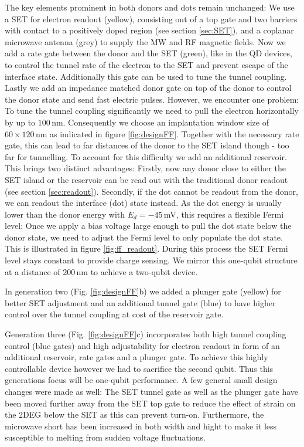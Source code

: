 The key elements prominent in both donors and dots remain unchanged: We use a SET for electron readout (yellow), consisting out of a top gate and two barriers with contact to a positively doped region (see section \ref{sec:SET}), and a coplanar microwave antenna (grey) to supply the MW and RF magnetic fields. 
Now we add a rate gate between the donor and the SET (green), like in the QD devices, to control the tunnel rate of the electron to the SET and prevent escape of the interface state.  Additionally this gate can be used to tune the tunnel coupling. Lastly we add an impedance matched donor gate on top of the donor to control the donor state and send fast electric pulses. 
However, we encounter one problem: To tune the tunnel coupling significantly we need to pull the electron horizontally by up to $100\,$nm. Consequently we choose an implantation window size of $60\times120\,$nm as indicated in figure \ref{fig:designFF}. Together with the necessary rate gate, this can lead to far distances of the donor to the SET island though - too far for tunnelling. To account for this difficulty we add an additional reservoir. This brings two distinct advantages: Firstly, now any donor close to either the SET island or the reservoir can be read out with the traditional donor readout (see section \ref{sec:readout}). Secondly, if the dot cannot be readout from the donor, we can readout the interface (dot) state instead. As the dot energy is usually lower than the donor energy with $E_{d}=-45\,$mV, this requires a flexible Fermi level: Once we apply a bias voltage large enough to pull the dot state below the donor state, we need to adjust the Fermi level to only populate the dot state. This is illustrated in figure \ref{fig:ff_readout}. During this process the SET Fermi level stays constant to provide charge sensing. We mirror this one-qubit structure at a distance of $200\,$nm to achieve a two-qubit device.

In generation two (Fig. \ref{fig:designFF}b) we added a plunger gate (yellow) for better SET adjustment and an additional tunnel gate (blue) to have higher control over the tunnel coupling at cost of the reservoir gate. 

Generation three (Fig. \ref{fig:designFF}c) incorporates both high tunnel coupling control (blue gates) and high adjustability for electron readout in form of an additional reservoir, rate gates and a plunger gate. To achieve this highly controllable device however we had to sacrifice the second qubit. Thus this generations focus will be one-qubit performance.
A few general small design changes were made as well: The SET tunnel gate as well as the plunger gate have been moved further away from the SET top gate to reduce the effect of strain on the 2DEG below the SET as this can prevent turn-on. Furthermore, the microwave short has been increased in both width and hight to make it less susceptible to melting from sudden voltage fluctuations. 


